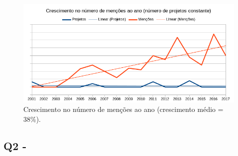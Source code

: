 

\begin{figure}[h]
  \center
  \includegraphics[scale=0.6]{imagens/mentions-trend.png}
  \caption{Crescimento no número de menções ao ano (crescimento médio = 38\%).}
  \label{mentions-trend}
\end{figure}



\subsection{Q2 - \QuestaoDois} %

